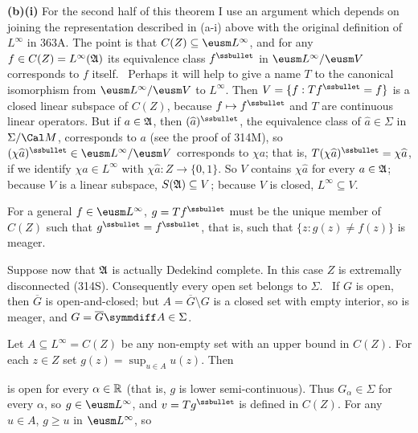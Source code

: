 {\medskip

{\bf (b)(i)} For the second half of this theorem I use an argument which
depends on joining the representation described in (a-i) above with the
original definition of $L^{\infty}$ in 363A.   The point is that
$C(Z)\subseteq\eusm L^{\infty}$, and for any
$f\in C(Z)=L^{\infty}(\frak A)$ its equivalence class $f^{\ssbullet}$ in
$\eusm L^{\infty}/\eusm V$
corresponds to $f$ itself.   \Prf\ Perhaps it will help to give a name
$T$ to the canonical isomorphism from $\eusm L^{\infty}/\eusm V$ to
$L^{\infty}$.   Then $V=\{f:Tf^{\ssbullet}=f\}$ is a
closed linear subspace of $C(Z)$, because $f\mapsto f^{\ssbullet}$ and
$T$ are continuous linear operators.   But if $a\in\frak A$, then
$(\widehat a)^{\ssbullet}$, the equivalence class of
$\widehat a\in\Sigma$ in $\Sigma/\Cal M$, corresponds to $a$ (see the
proof of 314M), so
$(\chi\widehat a)^{\ssbullet}\in\eusm L^{\infty}/\eusm V$
corresponds to $\chi a$;  that is,
$T(\chi\widehat a)^{\ssbullet}=\chi\widehat a$, if we identify
$\chi a\in L^{\infty}$ with $\chi\widehat a:Z\to\{0,1\}$.   So $V$
contains $\chi\widehat a$ for every $a\in\frak A$;  because $V$ is a
linear subspace, $S(\frak A)\subseteq V$;  because $V$ is closed,
$L^{\infty}\subseteq V$.\ \Qed

For a general $f\in\eusm L^{\infty}$, $g=Tf^{\ssbullet}$ must be the
unique member of $C(Z)$ such that $g^{\ssbullet}=f^{\ssbullet}$, that
is, such that $\{z:g(z)\ne f(z)\}$ is meager.

\medskip

 Suppose now that $\frak A$ is actually Dedekind
complete.   In this case $Z$ is extremally disconnected (314S).
Consequently every open set belongs to $\Sigma$.   \Prf\ If $G$ is open,
then $\overline{G}$ is open-and-closed;  but $A=\overline{G}\setminus G$
is a closed set with empty interior, so is meager, and
$G=\overline{G}\symmdiff A\in\Sigma$.\ \Qed

Let $A\subseteq L^{\infty}=C(Z)$ be any
non-empty set with an upper bound in $C(Z)$.    For each $z\in Z$ set
$g(z)=\sup_{u\in A}u(z)$.   Then


\noindent is open for every $\alpha\in\Bbb R$ (that is, $g$ is lower
semi-continuous).   Thus $G_{\alpha}\in \Sigma$ for every $\alpha$, so
$g\in\eusm L^{\infty}$, and $v=Tg^{\ssbullet}$ is defined in $C(Z)$.
For any $u\in A$, $g\ge u$ in $\eusm L^{\infty}$, so

}
